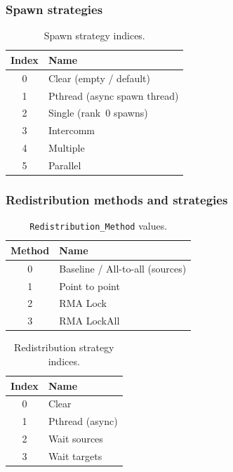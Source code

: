 \subsubsection{Spawn strategies}
\label{tab:spawn-strategies}

\begin{table}[H]
\centering
\small
\begin{tabular}{@{}cl@{}}
\toprule
\textbf{Index} & \textbf{Name} \\
\midrule
0 & Clear (empty / default) \\
1 & Pthread (async spawn thread) \\
2 & Single (rank~0 spawns) \\
3 & Intercomm \\
4 & Multiple \\
5 & Parallel \\
\bottomrule
\end{tabular}
\caption{Spawn strategy indices.}
\end{table}

\subsubsection{Redistribution methods and strategies}
\label{tab:red-methods}

\begin{table}[H]
\centering
\small
\begin{tabular}{@{}cl@{}}
\toprule
\textbf{Method} & \textbf{Name} \\
\midrule
0 & Baseline / All-to-all (sources) \\
1 & Point to point \\
2 & RMA Lock \\
3 & RMA LockAll \\
\bottomrule
\end{tabular}
\caption{\texttt{Redistribution\_Method} values.}
\end{table}

\begin{table}[H]
\centering
\small
\begin{tabular}{@{}cl@{}}
\toprule
\textbf{Index} & \textbf{Name} \\
\midrule
0 & Clear \\
1 & Pthread (async) \\
2 & Wait sources \\
3 & Wait targets \\
\bottomrule
\end{tabular}
\caption{Redistribution strategy indices.}
\end{table}

